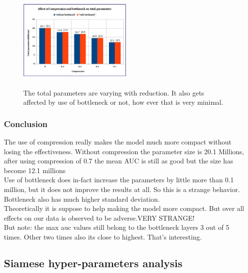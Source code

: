 \begin{figure}[ht]
\centering
\includegraphics[height=5cm,width=0.5\textwidth]{images/densenet/compression_and_bn_vs_parameters}
\caption{The total parameters are varying with reduction. It also gets affected by use of bottleneck or not, how ever that is very minimal.}
\label{fig:compression_and_bn_vs_parameters}
\end{figure}

\subsubsection{Conclusion}
The use of compression really makes the model much more compact without losing the effectiveness. Without compression the parameter size is 20.1 Millions, after using compression of 0.7 the mean AUC is still as good but 
the size has become 12.1 millions\\
Use of bottleneck does in-fact increase the parameters by little more than 0.1 million, but it does not improve the results at all. So this is a strange behavior.\\ 
Bottleneck also has much higher standard deviation.\\ 
Theoretically it is suppose to help making the model more compact. But over all effects on our data is observed to be adverse.VERY STRANGE!\\
But note: the max auc values still belong to the bottleneck layers 3 out of 5 times. Other two times also its close to highest. That's interesting. 

\subsection{Siamese hyper-parameters analysis}

